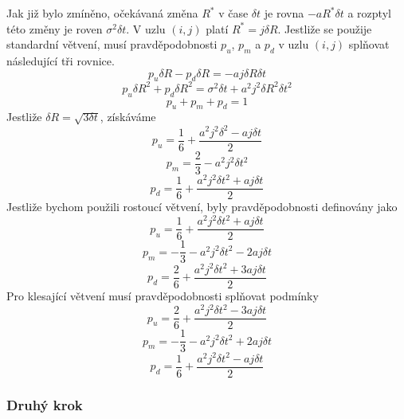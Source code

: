 \documentclass[a4paper]{book}
\begin{document}
Jak již bylo zmíněno, očekávaná změna $R^*$ v čase $\delta t$ je rovna $-aR^* \delta t$ a rozptyl této změny je roven $\sigma^2 \delta t$. V uzlu $(i,j)$ platí $R^* = j \delta R$. Jestliže se použije standardní větvení, musí pravděpodobnosti $p_u$, $p_m$ a $p_d$ v uzlu $(i,j)$ splňovat následující tři rovnice.
\begin{equation*}
p_u \delta R - p_d \delta R = -a j \delta R \delta t
\end{equation*}
\begin{equation*}
p_u \delta R^2 + p_d \delta R^2 = \sigma^2 \delta t + a^2 j^2 \delta R^2 \delta t^2
\end{equation*}
\begin{equation*}
p_u + p_m + p_d = 1
\end{equation*}
Jestliže $\delta R = \sqrt{3 \delta t}$, získáváme
\begin{equation*}
p_u = \frac{1}{6} + \frac{a^2 j^2 \delta^2 - a j \delta t}{2}
\end{equation*}
\begin{equation*}
p_m = \frac{2}{3}- a^2 j^2 \delta t^2
\end{equation*}
\begin{equation*}
p_d = \frac{1}{6} + \frac{a^2 j^2 \delta t^2 + a j \delta t}{2}
\end{equation*}
Jestliže bychom použili rostoucí větvení, byly pravděpodobnosti definovány jako
\begin{equation*}
p_u = \frac{1}{6} + \frac{a^2 j^2 \delta t^2 + a j \delta t}{2}
\end{equation*}
\begin{equation*}
p_m = - \frac{1}{3}-a^2 j^2 \delta t^2 - 2aj \delta t
\end{equation*}
\begin{equation*}
p_d = \frac{2}{6} + \frac{a^2 j^2 \delta t^2 + 3aj \delta t}{2}
\end{equation*}
Pro klesající větvení musí pravděpodobnosti splňovat podmínky
\begin{equation*}
p_u = \frac{2}{6} + \frac{a^2 j^2 \delta t^2 - 3aj \delta t}{2}
\end{equation*}
\begin{equation*}
p_m = - \frac{1}{3}-a^2 j^2 \delta t^2 + 2aj \delta t
\end{equation*}
\begin{equation*}
p_d = \frac{1}{6} + \frac{a^2 j^2 \delta t^2 - a j \delta t}{2}
\end{equation*}

\subsubsection{Druhý krok}
\end{document}
